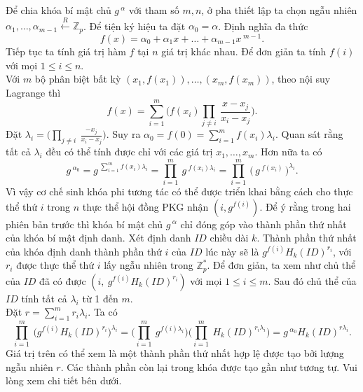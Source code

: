 \documentclass[class=report, crop=false]{standalone}
\begin{document}
			Để chia khóa bí mật chủ $g\,^\alpha$ với tham số $m, n$, ở pha thiết lập ta chọn ngẫu nhiên $\alpha_1, \dots, \alpha_{m - 1} \xleftarrow{R} \mathbb{Z}_p$. Để tiện ký hiệu ta đặt $\alpha_0 = \alpha$. Định nghĩa đa thức
			\[
				f(x) = \alpha_0 + \alpha_1x + \dots + \alpha_{m - 1}x\,^{m - 1}.
			\]
			Tiếp tục ta tính giá trị hàm $f$ tại $n$ giá trị khác nhau. Để đơn giản ta tính $f(i)$ với mọi $1 \leq i \leq n$. \\
			Với $m$ bộ phân biệt bất kỳ $(x_1, f(x_1)), \dots, (x_m, f(x_m))$, theo nội suy Lagrange thì
			\[
				f(x) = \sum_{i = 1}^m \bigg(f(x_i) \prod_{j \neq i}\ \frac{x - x_j}{x_i - x_j} \bigg).
			\]
			Đặt $\lambda_i = \bigg(\displaystyle\prod_{j \neq i}\ \frac{-x_j}{x_i - x_j} \bigg)$. Suy ra $\alpha_0 = f(0) = \displaystyle\sum_{i = 1}^m f(x_i)\lambda_i$. Quan sát rằng tất cả $\lambda_i$ đều có thể tính được chỉ với các giá trị $x_1, \dots, x_m$. Hơn nữa ta có
			\[
				g\,^{\alpha_0} = g\,^{\sum_{i = 1}^m f(x_i)\lambda_i} = \prod_{i = 1}^m \ g\,^{f(x_i)\lambda_i} = \prod_{i = 1}^m \ \Big(\, g\,^{f(x_i)}\, \Big)^{\lambda_i}.
			\]
			Vì vậy cơ chế sinh khóa phi tương tác có thể được triển khai bằng cách cho thực thể thứ $i$ trong $n$ thực thể hội đồng PKG nhận $(i, g^{f(i)})$. Để ý rằng trong hai phiên bản trước thì khóa bí mật chủ $g\,^\alpha$ chỉ đóng góp vào thành phần thứ nhất của khóa bí mật định danh. Xét định danh $ID$ chiều dài $k$. Thành phần thứ nhất của khóa định danh thành phần thứ $i$ của $ID$ lúc này sẽ là $g^{f(i)} H_k(ID)^{r_i}$, với $r_i$ được thực thể thứ $i$ lấy ngẫu nhiên trong $\mathbb{Z}_p^*$. Để đơn giản, ta xem như chủ thể của $ID$ đã có được $(i,\ g^{f(i)} H_k(ID)^{r_i})$ với mọi $1 \leq i \leq m$. Sau đó chủ thể của $ID$ tính tất cả $\lambda_i$ từ 1 đến $m$. \\
			Đặt $r = \sum_{i = 1}^m r_i \lambda_i$. Ta có
			\[
				\prod_{i = 1}^m \ \Big(g^{f(i)} H_k(ID)^{r_i} \Big)^{\lambda_i} =
				\Big(\prod_{i = 1}^m \ g^{f(i)\lambda_i} \Big) \Big(\prod_{i = 1}^m \ H_k(ID)^{r_i \lambda_i} \Big) =
				g\,^{\alpha_0} H_k(ID)^{r \lambda_i}.
			\]
			Giá trị trên có thể xem là một thành phần thứ nhất hợp lệ được tạo bởi lượng ngẫu nhiên $r$. Các thành phần còn lại trong khóa được tạo gần như tương tự. Vui lòng xem chi tiết bên dưới.
	\newpage
\end{document}
